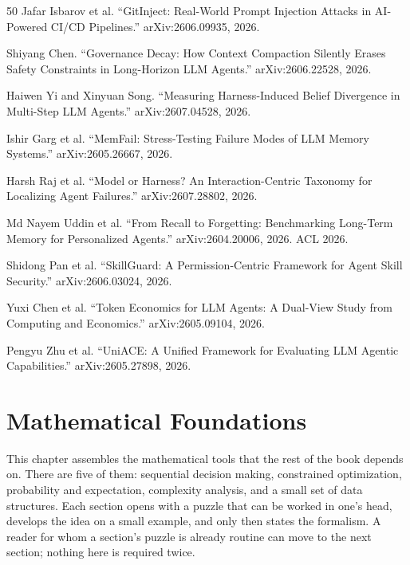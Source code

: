 \documentclass[11pt]{book}
\begin{document}
\begin{thebibliography}{50}
Jafar Isbarov et al.
``GitInject: Real-World Prompt Injection Attacks in AI-Powered CI/CD Pipelines.''
arXiv:2606.09935, 2026.

Shiyang Chen.
``Governance Decay: How Context Compaction Silently Erases Safety Constraints in Long-Horizon LLM Agents.''
arXiv:2606.22528, 2026.

Haiwen Yi and Xinyuan Song.
``Measuring Harness-Induced Belief Divergence in Multi-Step LLM Agents.''
arXiv:2607.04528, 2026.

Ishir Garg et al.
``MemFail: Stress-Testing Failure Modes of LLM Memory Systems.''
arXiv:2605.26667, 2026.

Harsh Raj et al.
``Model or Harness? An Interaction-Centric Taxonomy for Localizing Agent Failures.''
arXiv:2607.28802, 2026.

Md Nayem Uddin et al.
``From Recall to Forgetting: Benchmarking Long-Term Memory for Personalized Agents.''
arXiv:2604.20006, 2026. ACL 2026.

Shidong Pan et al.
``SkillGuard: A Permission-Centric Framework for Agent Skill Security.''
arXiv:2606.03024, 2026.

Yuxi Chen et al.
``Token Economics for LLM Agents: A Dual-View Study from Computing and Economics.''
arXiv:2605.09104, 2026.

Pengyu Zhu et al.
``UniACE: A Unified Framework for Evaluating LLM Agentic Capabilities.''
arXiv:2605.27898, 2026.
\end{thebibliography}

\chapter{Mathematical Foundations}
\label{ch:math}

This chapter assembles the mathematical tools that the rest of the book depends on. There are five of them: sequential decision making, constrained optimization, probability and expectation, complexity analysis, and a small set of data structures. Each section opens with a puzzle that can be worked in one's head, develops the idea on a small example, and only then states the formalism. A reader for whom a section's puzzle is already routine can move to the next section; nothing here is required twice.
\end{document}
